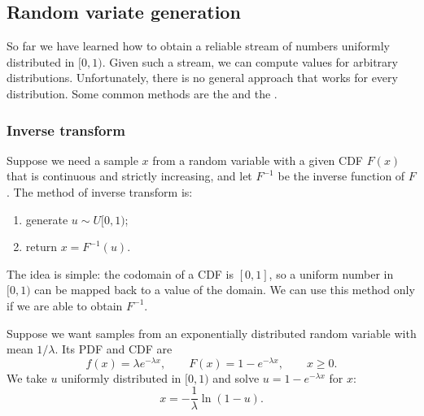\subsection{Random variate generation}

So far we have learned how to obtain a reliable stream of numbers uniformly distributed in $[0,1)$. Given such a stream, we can compute values for arbitrary distributions. Unfortunately, there is no general approach that works for every distribution. Some common methods are the  and the .

\subsubsection{Inverse transform}
Suppose we need a sample $x$ from a random variable with a given CDF $F(x)$ that is continuous and strictly increasing, and let $F^{-1}$ be the inverse function of $F$. The method of inverse transform is:
\begin{enumerate}
\item generate $u \sim U[0,1)$;
\item return $x = F^{-1}(u)$.
\end{enumerate}
The idea is simple: the codomain of a CDF is $[0,1]$, so a uniform number in $[0,1)$ can be mapped back to a value of the domain. We can use this method only if we are able to obtain $F^{-1}$.

\begin{example}
Suppose we want samples from an exponentially distributed random variable with mean $1/\lambda$. Its PDF and CDF are
\[
f(x) = \lambda e^{-\lambda x}, \qquad F(x) = 1 - e^{-\lambda x}, \qquad x \ge 0.
\]
We take $u$ uniformly distributed in $[0,1)$ and solve $u = 1 - e^{-\lambda x}$ for $x$:
\[
x = -\frac{1}{\lambda} \ln(1 - u).
\]
\end{example}
